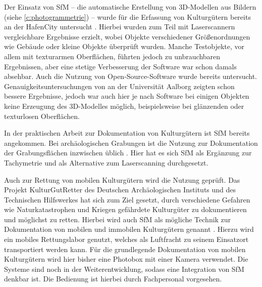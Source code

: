 \documentclass[./00PhotoBox]{subfiles}
\begin{document}
Der Einsatz von \acrfull{SfM} -- die au\-to\-ma\-tische Erstellung von 3D-Modellen aus Bildern (siehe \autoref{c:photogrammetrie}) -- wurde für die Erfassung von Kulturgütern bereits \citeyear{kersten2012} an der HafenCity untersucht \citep[vgl.][]{kersten2012}. Hierbei wurden zum Teil mit Laserscannern vergleichbare Ergebnisse erzielt, wobei Objekte verschiedener Größenordnungen wie Gebäude oder kleine Objekte überprüft wurden. Manche Testobjekte, vor allem mit texturarmen Oberflächen, führten jedoch zu unbrauchbaren Ergebnissen, aber eine stetige Verbesserung der Software war schon damals absehbar. Auch die Nutzung von Open-Source-Software wurde bereits untersucht. Genauigkeitsuntersuchungen von \citet{IvanNikolov} an der Universität Aalborg zeigten schon bessere Ergebnisse, jedoch war auch hier je nach Software bei einigen Objekten keine Erzeugung des 3D-Modelles möglich, beispielsweise bei glänzenden oder texturlosen Oberflächen.

In der praktischen Arbeit zur Dokumentation von Kulturgütern ist \acrfull{SfM} bereits angekommen. Bei archäologischen Grabungen ist die Nutzung zur Dokumentation der Grabungsflächen inzwischen üblich \citep[vgl.][]{grabungen_sfm}. Hier hat es sich \Gls{SfM} als Ergänzung zur Tachymetrie und als Alternative zum Laserscanning durchgesetzt.

Auch zur Rettung von mobilen Kulturgütern wird die Nutzung geprüft. Das Projekt KulturGutRetter des Deutschen Archäologischen Instituts und des Technischen Hilfswerkes hat sich zum Ziel gesetzt, durch verschiedene Gefahren wie Naturkatastrophen und Kriegen gefährdete Kulturgüter zu dokumentieren und möglichst zu retten. Hierbei wird auch \Gls{SfM} als mögliche Technik zur Dokumentation von mobilen und immobilen Kulturgütern genannt \citep[vgl.][S. 48]{kgr_article}. Hierzu wird ein mobiles Rettungslabor genutzt, welches als Luftfracht zu seinem Einsatzort transportiert werden kann. Für die grundlegende Dokumentation von mobilen Kulturgütern wird hier bisher eine Photobox mit einer Kamera verwendet. Die Systeme sind noch in der Weiterentwicklung, sodass eine Integration von \Gls{SfM} denkbar ist. Die Bedienung ist hierbei durch Fachpersonal vorgesehen. \citep[vgl.][]{kulturgutretter}

\biblio
\end{document}

